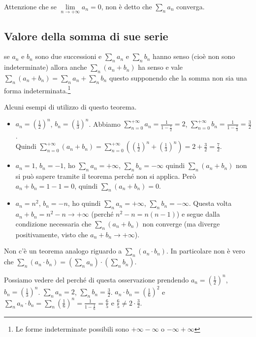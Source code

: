 \hspace{-15pt}Attenzione che se $\lim\limits_{n\to +\infty}a_n = 0$, non è detto che $\sum_n a_n$ converga.

\subsection{Valore della somma di sue serie}
\begin{theorem}
se $a_n$ e $b_n$ sono due successioni e $\sum_{n}a_n$ e $\sum_n b_n$ hanno senso (cioè non sono indeterminate) allora anche $\sum_n (a_n + b_n)$ ha senso e vale $\sum_n (a_n + b_n) = \sum_n a_n + \sum_n b_n$ questo supponendo che la somma non sia una forma indeterminata.\footnote{Le forme indeterminate possibili sono $+\infty - \infty$ o $-\infty + \infty$}
\end{theorem}

\begin{example}
Alcuni esempi di utilizzo di questo teorema.
\begin{itemize}
    \item $a_n = (\frac{1}{2})^n$, $b_n = (\frac{1}{3})^n$. Abbiamo $\sum^{+\infty}_{n=0}a_n = \frac{1}{1 - \frac{1}{2}} = 2$, $\sum^{+\infty}_{n=0}b_n = \frac{1}{1 - \frac{1}{3}} = \frac{3}{2}$. \\
    Quindi $\sum_{n=0}^{+\infty}(a_n + b_n) = \sum_{n=0}^{+\infty}((\frac{1}{2})^n + (\frac{1}{3})^n) = 2 + \frac{3}{2} = \frac{7}{2}$.
    \item $a_n = 1$, $b_n = -1$, ho $\sum_n a_n = +\infty$, $\sum_n b_n = -\infty$ quindi $\sum_n (a_n + b_n)$ non si può sapere tramite il teorema perché non si applica. Però $a_n + b_n = 1 - 1 = 0$, quindi $\sum_n (a_n + b_n) = 0$.
    \item $a_n = n^2$, $b_n = -n$, ho quindi $\sum_n a_n = +\infty$, $\sum_n b_n = -\infty$. Questa volta $a_n + b_n = n^2 - n \to +\infty$ (perché $n^2 - n = n(n-1)$) e segue dalla condizione necessaria che $\sum_n (a_n + b_n)$ non converge (ma diverge positivamente, visto che $a_n + b_n \to +\infty$).
\end{itemize}
\end{example}

\begin{observation}
Non c'è un teorema analogo riguardo a $\sum_n (a_n \cdot b_n)$. In particolare non è vero che $\sum_n(a_n \cdot b_n) = (\sum_n a_n) \cdot (\sum_n b_n)$.
\end{observation}

\begin{example}
Possiamo vedere del perché di questa osservazione prendendo $a_n = (\frac{1}{2})^n$, $b_n = (\frac{1}{3})^n$. $\sum_n a_n = 2$, $\sum_n b_n = \frac{3}{2}$. $a_n \cdot b_n = (\frac{1}{6})^2$ e $\sum_n a_n \cdot b_n = \sum_n (\frac{1}{6})^n = \frac{1}{1 - \frac{1}{6}} = \frac{6}{5}$ e $\frac{6}{5} \neq 2 \cdot \frac{3}{2}$.
\end{example}

